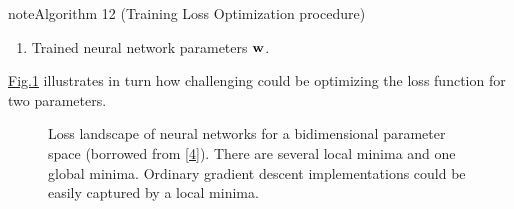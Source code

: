 \documentclass[letterpaper,10pt,english]{jupyterBook}
\let\sphinxpxdimen\pdfpxdimen\else\newdimen\sphinxpxdimen
\begin{document}
\begin{sphinxadmonition}{note}{Algorithm 12 (Training Loss Optimization procedure)}
\begin{enumerate}
\begin{enumerate}
\item {} 
\sphinxAtStartPar
Compute the training loss:
\begin{equation*}
\begin{split} \triangleright \,\,\,\,\,\, L_{train} = {1 \over N} \sum_{i=1}^N L(y_i, \hat{\bf y}_{i})\end{split}
\end{equation*}

\item {} 
\sphinxAtStartPar
Compute the gradient of the loss w.r.t. \({\bf w}\):
\begin{equation*}
\begin{split} \triangleright \,\,\,\,\,\, \nabla_{\bf w} L_{train}\end{split}
\end{equation*} 

\item {} 
\sphinxAtStartPar
Update the weights:
\begin{equation*}
\begin{split} \triangleright \,\,\,\,\,\, {\bf w} \gets {\bf w} - \eta_{k} \, \nabla_{\bf w} L_{train}\end{split}
\end{equation*}

\end{enumerate}

\item {} 
\sphinxAtStartPar
{} Trained neural network parameters \({\bf w}\).

\end{enumerate}
\end{sphinxadmonition}

\sphinxAtStartPar
\hyperref[\detokenize{neuralnets_backprop:loss-ladscape-fig}]{Fig.\@ \ref{\detokenize{neuralnets_backprop:loss-ladscape-fig}}} illustrates in turn how challenging could be optimizing the loss function for two parameters.


\begin{figure}
\centering
\noindent\sphinxincludegraphics[height=320\sphinxpxdimen]{{loss_landscape}.png}
\caption{Loss landscape of neural networks for a bi\sphinxhyphen{}dimensional parameter space (borrowed from {[}\hyperlink{cite.bibliography:id20}{4}{]}). There are several local minima and one global minima. Ordinary gradient descent implementations could be easily captured by a local minima.}\label{\detokenize{neuralnets_backprop:loss-ladscape-fig}}\end{figure}
\end{document}
